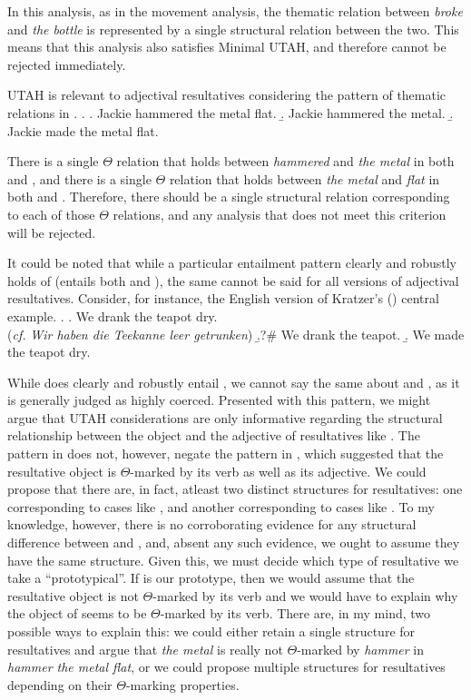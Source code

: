 \documentclass[MilwayThesis]{subfiles}
\begin{document}
In this analysis, as in the movement analysis, the thematic relation between \textit{broke} and \textit{the bottle} is represented by a single structural relation between the two.
This means that this analysis also satisfies Minimal UTAH, and therefore cannot be rejected immediately.

UTAH is relevant to adjectival resultatives considering the pattern of thematic relations in \Next.
\ex.
\a. Jackie hammered the metal flat.
\b. Jackie hammered the metal.
\b. Jackie made the metal flat.

There is a single $\Theta$ relation that holds between \textit{hammered} and \textit{the metal} in both \Last[a] and \Last[b], and there is a single $\Theta$ relation that holds between \textit{the metal} and \textit{flat} in  both \Last[a] and \Last[c]. 
Therefore, there should be a single structural relation corresponding to each of those $\Theta$ relations, and any analysis that does not meet this criterion will be rejected.

It could be noted that while a particular entailment pattern clearly and robustly holds of \Last (\Last[a] entails both \Last[b] and \Last[c]), the same cannot be said for all versions of adjectival resultatives.
Consider, for instance, \Next the English version of Kratzer's (\citeyear{kratzer2004building}) central example.
\ex. 
\a. We drank the teapot dry.\\
(\textit{cf.} \textit{Wir haben die Teekanne leer getrunken})
\b.?\# We drank the teapot.
\b. We made the teapot dry. 

While \Last[a] does clearly and robustly entail \Last[c], we cannot say the same about \Last[a] and \Last[b], as it is generally judged as highly coerced.
Presented with this pattern, we might argue that UTAH considerations are only informative regarding the structural relationship between the object and the adjective of resultatives like \Last[a].
The pattern in \Last does not, however, negate the pattern in \LLast, which suggested that the resultative object is $\Theta$-marked by its verb as well as its adjective.
We could propose that there are, in fact, atleast two distinct structures for resultatives: one corresponding to cases like \LLast, and another corresponding to cases like \Last.
To my knowledge, however, there is no corroborating evidence for any structural difference between \LLast[a] and \Last[a], and, absent any such evidence, we ought to assume they have the same structure.
Given this, we must decide which type of resultative we take a ``prototypical''.
If \Last[a] is our prototype, then we would assume that the resultative object is not $\Theta$-marked by its verb and we would have to explain why the object of \LLast[a] seems to be $\Theta$-marked by its verb.
There are, in my mind, two possible ways to explain this: we could either retain a single structure for resultatives and argue that \textit{the metal} is really not $\Theta$-marked by \textit{hammer} in \textit{hammer the metal flat}, or we could propose multiple structures for resultatives depending on their $\Theta$-marking properties.
\end{document}
